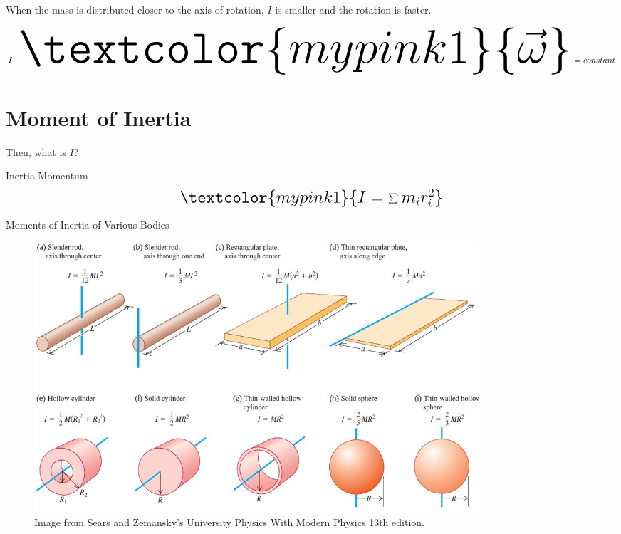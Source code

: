 \documentclass[]{beamer}
\begin{document}
\begin{frame}

When the mass is distributed closer to the axis of rotation, $I$ is smaller and the rotation is faster.
 
 
\begin{equation}%
  I \cdot \mbox{\fontsize{57.28}{21.6}\selectfont\( \textcolor{mypink1}{\vec{\omega}}\)}=constant  
\end{equation}
  
  \end{frame}


  \section*{Moment of Inertia}
\begin{frame}


Then, what is $I$?
 

\vspace{7mm}
\textcolor{mypink1}{Inertia Momentum}
\begin{equation}
  \mbox{\fontsize{17.28}{21.6}\selectfont\(\textcolor{mypink1}{I=\sum m_i r^2_i} \)}
\end{equation}   

  
  \end{frame}

\begin{frame}
  Moments of Inertia of Various Bodies
  \vspace{7mm}


\begin{figure}[h!]  
  \includegraphics[width=0.8\textwidth]{images/7.jpg}
  \caption{Image from Sears and Zemansky's University Physics With 
  Modern Physics 13th edition. }
\end{figure}


\end{frame}
\end{document}
